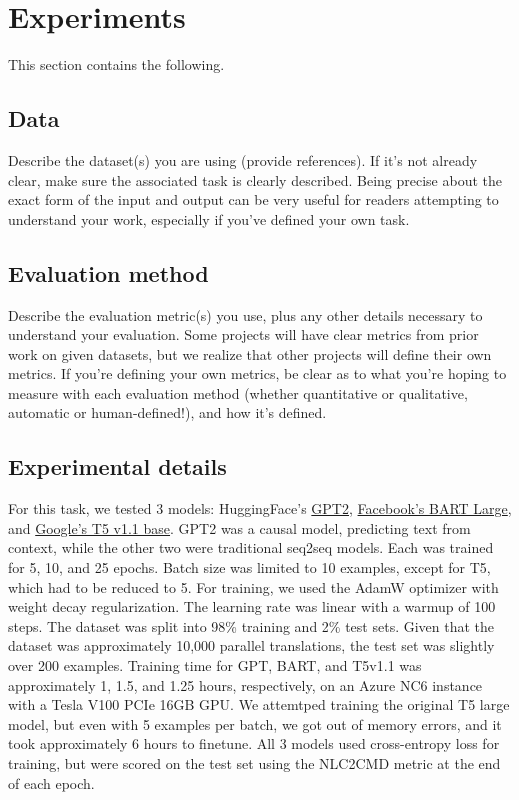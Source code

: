 \documentclass{article}
\begin{document}
\section{Experiments}
This section contains the following.

\subsection{Data}
Describe the dataset(s) you are using (provide references). If it's not already clear, make sure the associated task is clearly described.
Being precise about the exact form of the input and output can be very useful for readers attempting to understand your work, especially if you've defined your own task.

\subsection{Evaluation method}
Describe the evaluation metric(s) you use, plus any other details necessary to understand your evaluation.
Some projects will have clear metrics from prior work on given datasets, but we realize that other projects will define their own metrics.
If you're defining your own metrics, be clear as to what you're hoping to measure with each evaluation method (whether quantitative or qualitative, automatic or human-defined!), and how it's defined.

\color{red}
\subsection{Experimental details}
\color{black}
For this task, we tested 3 models: HuggingFace's
\href{https://huggingface.co/gpt2}{GPT2}\cite{gpt2},
\href{https://huggingface.co/facebook/bart-large}{Facebook's BART
	Large}\cite{bart}, and \href{https://huggingface.co/google/t5-v1_1-base}{Google's T5 v1.1
	base}. GPT2 was a causal model, predicting text from context, while the other
two were traditional seq2seq models. Each was trained for 5, 10, and 25
epochs. Batch size was limited to 10 examples, except for T5, which had to be
reduced to 5. For training, we used the AdamW optimizer with weight decay
regularization. The learning rate was linear with a warmup of 100 steps. The
dataset was split into 98\% training and 2\% test sets. Given that the
dataset was approximately 10,000 parallel translations, the test set was
slightly over 200 examples. Training time for GPT, BART, and T5v1.1 was
approximately 1, 1.5, and 1.25 hours, respectively, on an Azure NC6 instance
with a Tesla V100 PCIe 16GB GPU. We attemtped training the original T5 large
model, but even with 5 examples per batch, we got out of memory errors, and
it took approximately 6 hours to finetune. All 3 models used cross-entropy
loss for training, but were scored on the test set using the NLC2CMD metric
at the end of each epoch.
\end{document}
